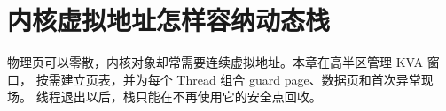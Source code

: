 \chapter{内核虚拟地址怎样容纳动态栈}

物理页可以零散，内核对象却常需要连续虚拟地址。本章在高半区管理 KVA 窗口，
按需建立页表，并为每个 Thread 组合 guard page、数据页和首次异常现场。
线程退出以后，栈只能在不再使用它的安全点回收。



